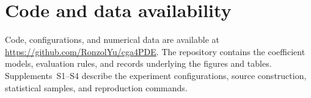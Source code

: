 \section{Code and data availability}
\label{sec:code-data}

Code, configurations, and numerical data are available at \url{https://github.com/RonzolYu/cga4PDE}. The repository contains the coefficient models, evaluation rules, and records underlying the figures and tables. Supplements~S1--S4 describe the experiment configurations, source construction, statistical samples, and reproduction commands.
